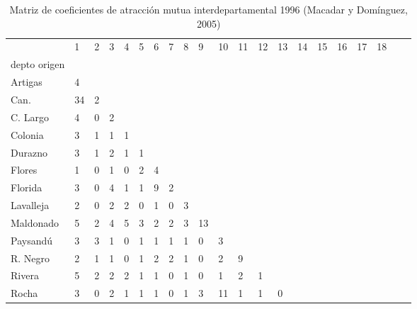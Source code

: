 \begin{table}
\centering
\caption{Matriz de coeficientes de atracción mutua interdepartamental 1996 (Macadar y Domínguez, 2005)}
\begin{tabular}{lp{0.7cm}p{0.7cm}p{0.7cm}p{0.7cm}p{0.7cm}p{0.7cm}p{0.7cm}p{0.7cm}p{0.7cm}p{0.7cm}p{0.7cm}p{0.7cm}p{0.7cm}p{0.7cm}p{0.7cm}p{0.7cm}p{0.7cm}p{0.7cm}p{0.7cm}p{0.7cm}}
\toprule
{} &   1 &  2 &  3 &  4 &  5 &  6 &  7 &  8 &  9 &  10 &  11 &  12 &  13 &  14 &  15 &  16 &  17 &  18 \\
depto origen &     &    &    &    &    &    &    &    &    &     &     &     &     &     &     &     &     &     \\
\midrule
Artigas      &   4 &    &    &    &    &    &    &    &    &     &     &     &     &     &     &     &     &     \\
Can.         &  34 &  2 &    &    &    &    &    &    &    &     &     &     &     &     &     &     &     &     \\
C. Largo     &   4 &  0 &  2 &    &    &    &    &    &    &     &     &     &     &     &     &     &     &     \\
Colonia      &   3 &  1 &  1 &  1 &    &    &    &    &    &     &     &     &     &     &     &     &     &     \\
Durazno      &   3 &  1 &  2 &  1 &  1 &    &    &    &    &     &     &     &     &     &     &     &     &     \\
Flores       &   1 &  0 &  1 &  0 &  2 &  4 &    &    &    &     &     &     &     &     &     &     &     &     \\
Florida      &   3 &  0 &  4 &  1 &  1 &  9 &  2 &    &    &     &     &     &     &     &     &     &     &     \\
Lavalleja    &   2 &  0 &  2 &  2 &  0 &  1 &  0 &  3 &    &     &     &     &     &     &     &     &     &     \\
Maldonado    &   5 &  2 &  4 &  5 &  3 &  2 &  2 &  3 & 13 &     &     &     &     &     &     &     &     &     \\
Paysandú     &   3 &  3 &  1 &  0 &  1 &  1 &  1 &  1 &  0 &   3 &     &     &     &     &     &     &     &     \\
R. Negro     &   2 &  1 &  1 &  0 &  1 &  2 &  2 &  1 &  0 &   2 &   9 &     &     &     &     &     &     &     \\
Rivera       &   5 &  2 &  2 &  2 &  1 &  1 &  0 &  1 &  0 &   1 &   2 &   1 &     &     &     &     &     &     \\
Rocha        &   3 &  0 &  2 &  1 &  1 &  1 &  0 &  1 &  3 &  11 &   1 &   1 &   0 &     &     &     &     &     \\

\end{tabular}
\end{table}
